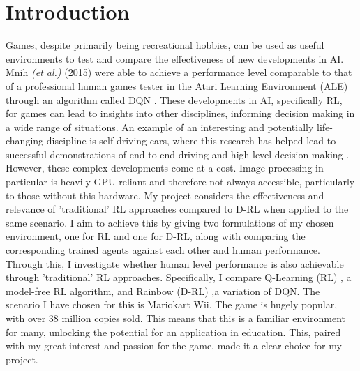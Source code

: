 \chapter*{Introduction}
Games, despite primarily being recreational hobbies, can be used as useful environments to test and compare the effectiveness of new developments in AI. Mnih \textit{(et al.)} (2015) \cite{mnih2015human} were able to achieve a performance level comparable to that of a professional human games tester in the Atari Learning Environment (ALE) \cite{bellemare2013arcade} through an algorithm called DQN \cite{mnih2013playing}. These developments in AI, specifically RL, for games can lead to insights into other disciplines, informing decision making in a wide range of situations.
An example of an interesting and potentially life-changing discipline is self-driving cars, where this research has helped lead to successful demonstrations of end-to-end driving \cite{DBLP:journals/corr/BojarskiTDFFGJM16} and high-level decision making \cite{duan2020hierarchical}. However, these complex developments come at a cost. Image processing in particular is heavily GPU reliant and therefore not always accessible, particularly to those without this hardware. My project considers the effectiveness and relevance of 'traditional' RL approaches compared to D-RL when applied to the same scenario. I aim to achieve this by giving two formulations of my chosen environment, one for RL and one for D-RL, along with comparing the corresponding trained agents against each other and human performance. Through this, I investigate whether human level performance is also achievable through 'traditional' RL approaches. Specifically, I compare Q-Learning (RL) \cite{watkins1992q}, a model-free RL algorithm, and Rainbow (D-RL) \cite{hessel2018rainbow},a variation of DQN.
The scenario I have chosen for this is Mariokart Wii. The game is hugely popular, with over 38 million copies sold. This means that this is a familiar environment for many, unlocking the potential for an application in education. This, paired with my great interest and passion for the game, made it a clear choice for my project. 